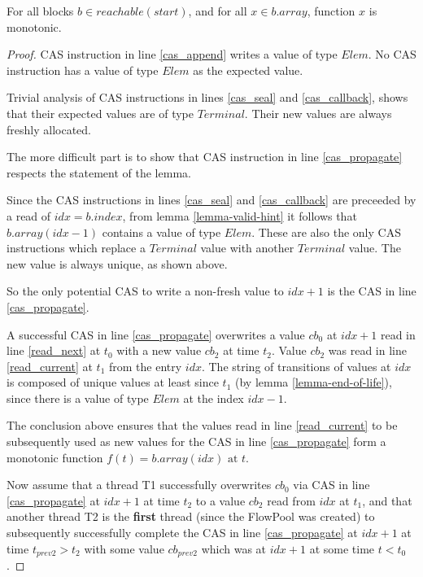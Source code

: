 \documentclass[runningheads,a4paper]{llncs}
\begin{document}
\begin{lemma}[Freshness]\label{lemma-freshness}
For all blocks $b \in reachable(start)$, and for all $x \in b.array$,
function $x$ is monotonic.
\end{lemma}

\begin{proof}
CAS instruction in line \ref{cas_append} writes a value of type
$Elem$. No CAS instruction has a value of type $Elem$ as the expected value.

Trivial analysis of CAS instructions in lines \ref{cas_seal} and
\ref{cas_callback}, shows that their expected values are of type
$Terminal$. Their new values are always freshly allocated.

The more difficult part is to show that CAS instruction in line
\ref{cas_propagate} respects the statement of the lemma.

Since the CAS instructions in lines \ref{cas_seal} and
\ref{cas_callback} are preceeded by a read of $idx = b.index$,
from lemma \ref{lemma-valid-hint} it follows that $b.array(idx - 1)$ 
contains a value of type $Elem$.
These are also the only CAS instructions which replace a $Terminal$
value with another $Terminal$ value. The new value is always unique, as
shown above.

So the only potential CAS to write a non-fresh value to $idx + 1$ is the CAS
in line \ref{cas_propagate}.

A successful CAS in line \ref{cas_propagate} overwrites a value $cb_0$ at $idx + 1$
read in line \ref{read_next} at $t_0$ with a new value $cb_2$ at time $t_2$. Value $cb_2$ was
read in line \ref{read_current} at $t_1$ from the entry $idx$. The
string of transitions of values at $idx$ is composed of unique values
at least since $t_1$ (by lemma \ref{lemma-end-of-life}), since there is
a value of type $Elem$ at the index $idx - 1$.

The conclusion above ensures that the values read in line \ref{read_current}
to be subsequently used as new values for the CAS in line \ref{cas_propagate}
form a monotonic function $f(t) = b.array(idx) \text{ at } t$.

Now assume that a thread T1 successfully overwrites $cb_0$
via CAS in line \ref{cas_propagate} at $idx + 1$ at time $t_2$ 
to a value $cb_2$ read from $idx$ at $t_1$, and that another thread T2 
is the \textbf{first} thread (since the FlowPool was created) to subsequently successfully
complete the CAS in line \ref{cas_propagate} at $idx + 1$ at time
$t_{prev2} > t_2$ with some value $cb_{prev2}$ which was at $idx + 1$ at some time
$t < t_0$.


\end{proof}
\end{document}
